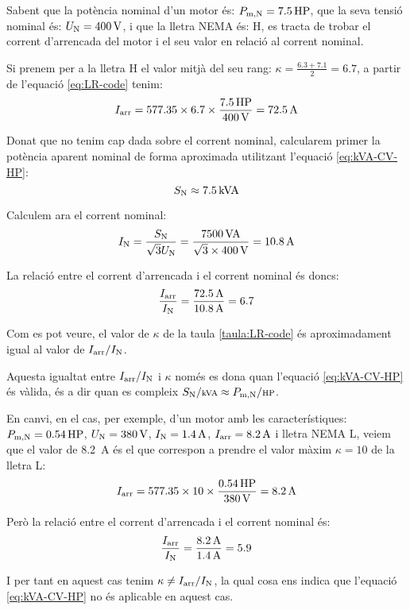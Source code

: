 \begin{exemple}
    Sabent que la  potència nominal d'un motor és: $P\ped{m,N} = \SI{7,5}{HP}$,    que la seva tensió nominal és: $U\ped{N}=\SI{400}{V}$, i que la lletra NEMA és: H, es tracta de trobar el corrent d'arrencada  del  motor i el seu valor en relació al corrent nominal.

    Si prenem per a la lletra H el valor mitjà del seu rang: $\kappa = \frac{\num{6,3}+\num{7,1}}{2}=\num{6,7}$, a partir de l'equació  \eqref{eq:LR-code} tenim:
    \[
      I\ped{arr} = \num{577,35} \times \num{6,7} \times \frac{\SI{7,5}{HP}}{\SI{400}{V}} = \SI{72,5}{A}
    \]

    Donat que no tenim cap dada sobre el corrent nominal, calcularem primer la potència aparent nominal de forma aproximada utilitzant l'equació \eqref{eq:kVA-CV-HP}:
    \[
        S\ped{N} \approx \SI{7,5}{kVA}
    \]

    Calculem ara el corrent nominal:
    \[
        I\ped{N}= \frac{S\ped{N}}{\sqrt{3} U\ped{N}} = \frac{\SI{7500}{VA}}{\sqrt{3}\times\SI{400}{V}} = \SI{10,8}{A}
    \]

    La relació entre el corrent d'arrencada i el corrent nominal és doncs:
    \[
        \frac{I\ped{arr}}{I\ped{N}} = \frac{\SI{72,5}{A}}{\SI{10,8}{A}} = \num{6,7}
    \]

    Com es pot veure, el valor  de $\kappa$ de la taula \vref{taula:LR-code} és aproximadament igual al valor de $I\ped{arr}/I\ped{N}$.

    Aquesta igualtat entre $I\ped{arr}/I\ped{N}$ i $\kappa$ només es dona quan l'equació \eqref{eq:kVA-CV-HP} és vàlida, és a dir quan es compleix $S\ped{N}/{\scriptstyle \si{kVA}} \approx  P\ped{m,N}/{\scriptstyle \si{HP}}$.

    En canvi, en el cas, per exemple, d'un motor amb les característiques: $P\ped{m,N} = \SI{0,54}{HP}$, $U\ped{N} = \SI{380}{V}$, $I\ped{N} = \SI{1,4}{A}$, $I\ped{arr} = \SI{8,2}{A}$ i lletra NEMA L, veiem que el valor de \SI{8,2}{A} és el que correspon a prendre  el valor màxim $\kappa = 10$ de la lletra L:
    \[
      I\ped{arr} = \num{577,35} \times 10 \times \frac{\SI{0,54}{HP}}{\SI{380}{V}} = \SI{8,2}{A}
    \]

    Però la relació entre el corrent d'arrencada i el corrent nominal és:
    \[
        \frac{I\ped{arr}}{I\ped{N}} = \frac{\SI{8,2}{A}}{\SI{1,4}{A}} = \num{5,9}
    \]

    I per tant  en aquest cas tenim $\kappa \neq I\ped{arr}/I\ped{N}$, la qual cosa ens indica que l'equació \eqref{eq:kVA-CV-HP} no és aplicable en aquest cas.
\end{exemple}

